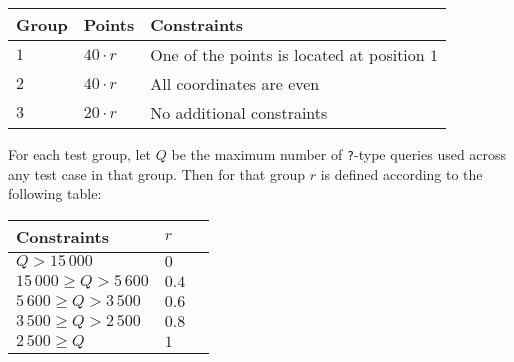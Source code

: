 \noindent
\begin{tabular}{| l | l | l |}
  \hline
  Group & Points       & Constraints \\ \hline
  $1$   & $40 \cdot r$ & One of the points is located at position $1$ \\ \hline
  $2$   & $40 \cdot r$ & All coordinates are even \\ \hline
  $3$   & $20 \cdot r$ & No additional constraints \\ \hline
\end{tabular}

For each test group, let $Q$ be the maximum number of \texttt{?}-type queries used across any test case in that group.
Then for that group $r$ is defined according to the following table:

\noindent
\begin{tabular}{| l | l | l |}
  \hline
  Constraints                & $r$ \\ \hline
  $             Q > 15\,000$ & $0$ \\ \hline
  $ 15\,000 \ge Q > 5\,600$  & $0.4$  \\ \hline
  $  5\,600 \ge Q > 3\,500$  & $0.6$  \\ \hline
  $  3\,500 \ge Q > 2\,500$  & $0.8$  \\ \hline
  $  2\,500 \ge Q$           & $1$  \\ \hline
\end{tabular}

